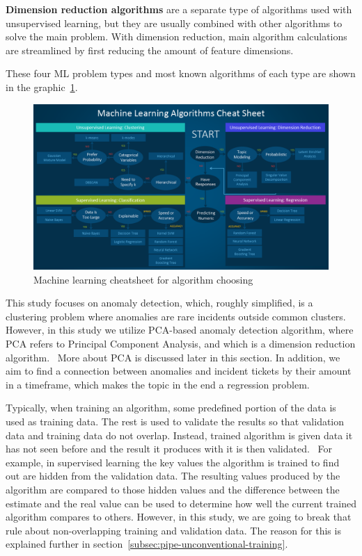 \textbf{Dimension reduction algorithms} are a separate type of algorithms used with unsupervised learning,
but they are usually combined with other algorithms
to solve the main problem.
With dimension reduction,
main algorithm calculations are streamlined by first reducing the amount of feature dimensions.~\cite{li2017mlalgorithm}

These four ML problem types
and most known algorithms of each type
are shown in the graphic~\ref{fig:ml-algorithm-cheatsheet}.


\begin{figure}[htb]
    \centering
    \includegraphics[width=150mm]{./appendices/machine-learning-cheet-sheet-2}
    \caption{Machine learning cheatsheet for algorithm choosing\cite{li2017mlalgorithm}
    \label{fig:ml-algorithm-cheatsheet}}
\end{figure}

This study focuses on anomaly detection,
which, roughly simplified, is a clustering problem
where anomalies are rare incidents outside common clusters.
However,
in this study we utilize PCA-based anomaly detection algorithm,
where PCA refers to Principal Component Analysis,
and which is a dimension reduction algorithm.~\cite{li2017mlalgorithm}
More about PCA
is discussed later in this section.
In addition,
we aim to find a connection between anomalies and incident tickets
by their amount in a timeframe,
which makes the topic in the end a regression problem.

Typically,
when training an algorithm,
some predefined portion of the data
is used as training data.
The rest is used to validate the results
so that validation data and training data do not overlap.
Instead, trained algorithm is given data it has not seen before
and the result it produces with it is then validated.~\cite{baheti2022datasplit}
For example,
in supervised learning
the key values the algorithm is trained to find out
are hidden from the validation data.
The resulting values produced by the algorithm
are compared to those hidden values
and the difference between the estimate and the real value
can be used to determine how well the current trained algorithm compares to others.
However, in this study,
we are going to break that rule
about non-overlapping training and validation data.
The reason for this is explained further in section~\ref{subsec:pipe-unconventional-training}.

